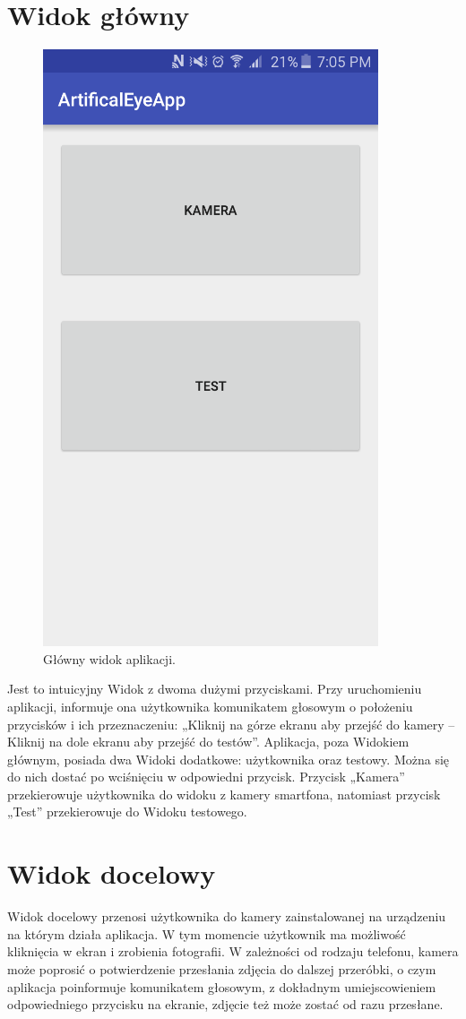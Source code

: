 \documentclass[eng,oneside]{mgr}
\begin{document}
\section {Widok główny}
\begin{figure}[htbp]
\centering
\includegraphics{glownywidok.png}
\caption{Główny widok aplikacji.}\par\medskip
\end{figure}
Jest to intuicyjny Widok z dwoma dużymi przyciskami. Przy uruchomieniu aplikacji, informuje ona użytkownika komunikatem głosowym o położeniu przycisków i ich przeznaczeniu: „Kliknij na górze ekranu aby przejść do kamery – Kliknij na dole ekranu aby przejść do testów”. Aplikacja, poza Widokiem głównym, posiada dwa Widoki dodatkowe: użytkownika oraz testowy. Można się do nich dostać po wciśnięciu w odpowiedni przycisk. Przycisk „Kamera” przekierowuje użytkownika do widoku z kamery smartfona, natomiast przycisk „Test” przekierowuje do Widoku testowego.
\section {Widok docelowy}
Widok docelowy przenosi użytkownika do kamery zainstalowanej na urządzeniu na którym działa aplikacja. W tym momencie użytkownik ma możliwość kliknięcia w ekran i zrobienia fotografii. W zależności od rodzaju telefonu, kamera może poprosić o potwierdzenie przesłania zdjęcia do dalszej przeróbki, o czym aplikacja poinformuje komunikatem głosowym, z dokładnym umiejscowieniem odpowiedniego przycisku na ekranie, zdjęcie też może zostać od razu przesłane.
\end{document}
